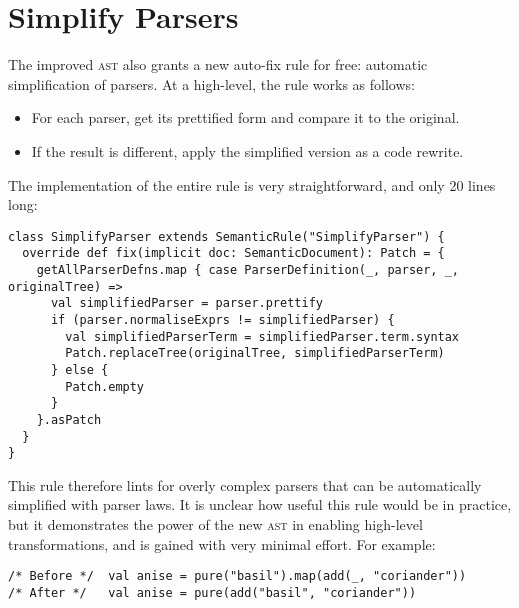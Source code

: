 \documentclass[../../main.tex]{subfiles}
\begin{document}
\section{Simplify Parsers}
The improved  \textsc{ast} also grants a new auto-fix rule for free: automatic simplification of parsers.
At a high-level, the rule works as follows:
\begin{itemize}
  \item For each parser, get its prettified form and compare it to the original.
  \item If the result is different, apply the simplified version as a code rewrite.
\end{itemize}
%
The implementation of the entire rule is very straightforward, and only 20 lines long:
\begin{verbatim}
class SimplifyParser extends SemanticRule("SimplifyParser") {
  override def fix(implicit doc: SemanticDocument): Patch = {
    getAllParserDefns.map { case ParserDefinition(_, parser, _, originalTree) =>
      val simplifiedParser = parser.prettify
      if (parser.normaliseExprs != simplifiedParser) {
        val simplifiedParserTerm = simplifiedParser.term.syntax
        Patch.replaceTree(originalTree, simplifiedParserTerm)
      } else {
        Patch.empty
      }
    }.asPatch
  }
}
\end{verbatim}
%
This rule therefore lints for overly complex parsers that can be automatically simplified with parser laws.
It is unclear how useful this rule would be in practice, but it demonstrates the power of the new  \textsc{ast} in enabling high-level transformations, and is gained with very minimal effort.
For example:
\begin{verbatim}
/* Before */  val anise = pure("basil").map(add(_, "coriander"))
/* After */   val anise = pure(add("basil", "coriander"))
\end{verbatim}
\end{document}
